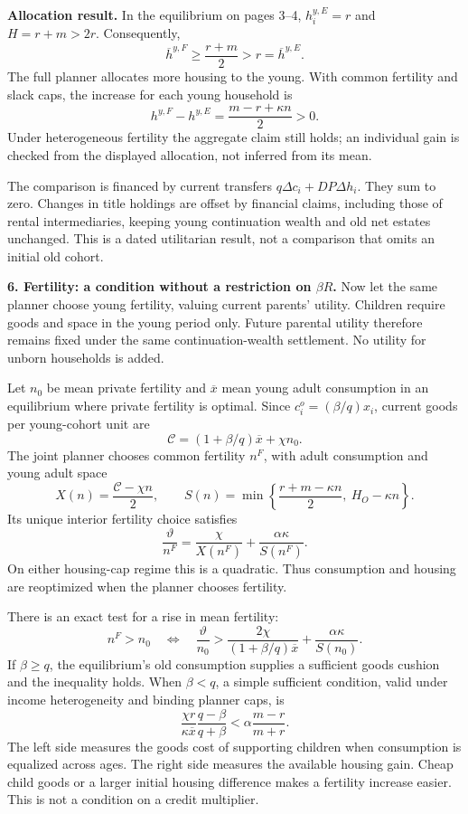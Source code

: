 \documentclass[11pt]{article}
\newcommand{\avg}[1]{\overline{#1}}
\begin{document}
\textbf{Allocation result.}
In the equilibrium on pages 3--4, $h_i^{y,E}=r$ and $H=r+m>2r$.
Consequently,
\[
\boxed{\avg h^{y,F}\ge\frac{r+m}{2}>r=\avg h^{y,E}.}
\]
The full planner allocates more housing to the young. With common fertility
and slack caps, the increase for each young household is
\[
h^{y,F}-h^{y,E}=\frac{m-r+\kappa n}{2}>0.
\]
Under heterogeneous fertility the aggregate claim still holds; an individual
gain is checked from the displayed allocation, not inferred from its mean.

The comparison is financed by current transfers
$q\Delta c_i+DP\Delta h_i$. They sum to zero. Changes in title holdings are
offset by financial claims, including those of rental intermediaries, keeping
young continuation wealth and old net estates unchanged. This is a dated
utilitarian result, not a comparison that omits an initial old cohort.

\newpage
\textbf{6. Fertility: a condition without a restriction on $\beta R$.}
Now let the same planner choose young fertility, valuing current parents'
utility. Children require goods and space in the young period only. Future
parental utility therefore remains fixed under the same continuation-wealth
settlement. No utility for unborn households is added.

Let $n_0$ be mean private fertility and $\avg x$ mean young adult
consumption in an equilibrium where private fertility is optimal. Since
$c_i^o=(\beta/q)x_i$, current goods per young-cohort unit are
\[
\mathcal C=(1+\beta/q)\avg x+\chi n_0.
\]
The joint planner chooses common fertility $n^F$, with adult consumption
and young adult space
\[
X(n)=\frac{\mathcal C-\chi n}{2},\qquad
S(n)=\min\left\{\frac{r+m-\kappa n}{2},\ H_O-\kappa n\right\}.
\]
Its unique interior fertility choice satisfies
\[
\boxed{\quad\frac{\vartheta}{n^F}
 =\frac{\chi}{X(n^F)}+\frac{\alpha\kappa}{S(n^F)}.\quad}
\]
On either housing-cap regime this is a quadratic. Thus consumption and
housing are reoptimized when the planner chooses fertility.

There is an exact test for a rise in mean fertility:
\[
\boxed{\quad n^F>n_0\quad\Longleftrightarrow\quad
\frac{\vartheta}{n_0}>
\frac{2\chi}{(1+\beta/q)\avg x}+\frac{\alpha\kappa}{S(n_0)}.\quad}
\]
If $\beta\ge q$, the equilibrium's old consumption supplies a sufficient
goods cushion and the inequality holds. When $\beta<q$, a simple sufficient
condition, valid under income heterogeneity and binding planner caps, is
\[
\boxed{\quad
\frac{\chi r}{\kappa\avg x}\frac{q-\beta}{q+\beta}
 <\alpha\frac{m-r}{m+r}.
\quad}
\]
The left side measures the goods cost of supporting children when consumption
is equalized across ages. The right side measures the available housing
gain. Cheap child goods or a larger initial housing difference makes a
fertility increase easier. This is not a condition on a credit multiplier.
\end{document}
